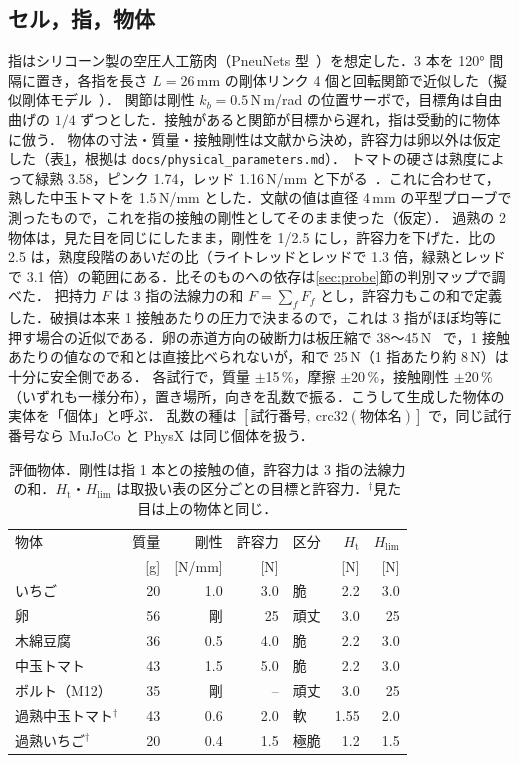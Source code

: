 \documentclass[a4paper,twocolumn,10pt]{ltjsarticle}
\begin{document}
\subsection{セル，指，物体}
指はシリコーン製の空圧人工筋肉（PneuNets 型~\cite{mosadegh2014}）を想定した．3 本を 120° 間隔に置き，各指を長さ $L=26$\,mm の剛体リンク 4 個と回転関節で近似した（擬似剛体モデル~\cite{howell2001}）．
関節は剛性 $k_b=0.5$\,N\,m/rad の位置サーボで，目標角は自由曲げの $1/4$ ずつとした．接触があると関節が目標から遅れ，指は受動的に物体に倣う．
物体の寸法・質量・接触剛性は文献から決め，許容力は卵以外は仮定した（表\ref{tab:obj}，根拠は \texttt{docs/physical\_parameters.md}）．
トマトの硬さは熟度によって緑熟 3.58，ピンク 1.74，レッド 1.16\,N/mm と下がる~\cite{vursavus2017}．これに合わせて，熟した中玉トマトを 1.5\,N/mm とした．文献の値は直径 4\,mm の平型プローブで測ったもので，これを指の接触の剛性としてそのまま使った（仮定）．
過熟の 2 物体は，見た目を同じにしたまま，剛性を 1/2.5 にし，許容力を下げた．比の 2.5 は，熟度段階のあいだの比（ライトレッドとレッドで 1.3 倍，緑熟とレッドで 3.1 倍）の範囲にある．比そのものへの依存は\ref{sec:probe}節の判別マップで調べた．
把持力 $F$ は 3 指の法線力の和 $F=\sum_f F_f$ とし，許容力もこの和で定義した．破損は本来 1 接触あたりの圧力で決まるので，これは 3 指がほぼ均等に押す場合の近似である．卵の赤道方向の破断力は板圧縮で 38〜45\,N~\cite{krivanek2016} で，1 接触あたりの値なので和とは直接比べられないが，和で 25\,N（1 指あたり約 8\,N）は十分に安全側である．
各試行で，質量 $\pm$15\,\%，摩擦 $\pm$20\,\%，接触剛性 $\pm$20\,\%（いずれも一様分布），置き場所，向きを乱数で振る．こうして生成した物体の実体を「個体」と呼ぶ．
乱数の種は $[\text{試行番号},\ \mathrm{crc32}(\text{物体名})]$ で，同じ試行番号なら MuJoCo と PhysX は同じ個体を扱う．

\begin{table}[t]
\centering\small
\caption{評価物体．剛性は指 1 本との接触の値，許容力は 3 指の法線力の和．$H_{\mathrm t}$・$H_{\mathrm{lim}}$ は取扱い表の区分ごとの目標と許容力．$^\dagger$見た目は上の物体と同じ．}
\label{tab:obj}
\setlength{\tabcolsep}{3pt}
\begin{tabular}{@{}lrrrlrr@{}}
\toprule
物体 & 質量 & 剛性 & 許容力 & 区分 & $H_{\mathrm t}$ & $H_{\mathrm{lim}}$ \\
 & [g] & [N/mm] & [N] & & [N] & [N] \\
\midrule
いちご & 20 & 1.0 & 3.0 & 脆 & 2.2 & 3.0 \\
卵 & 56 & 剛 & 25 & 頑丈 & 3.0 & 25 \\
木綿豆腐 & 36 & 0.5 & 4.0 & 脆 & 2.2 & 3.0 \\
中玉トマト & 43 & 1.5 & 5.0 & 脆 & 2.2 & 3.0 \\
ボルト（M12） & 35 & 剛 & -- & 頑丈 & 3.0 & 25 \\
\midrule
過熟中玉トマト$^\dagger$ & 43 & 0.6 & 2.0 & 軟 & 1.55 & 2.0 \\
過熟いちご$^\dagger$ & 20 & 0.4 & 1.5 & 極脆 & 1.2 & 1.5 \\
\bottomrule
\end{tabular}
\end{table}
\end{document}
